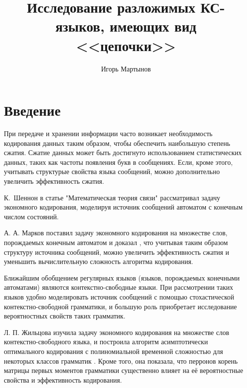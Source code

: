 \documentclass[12pt]{article}
\title{Исследование разложимых КС-языков, имеющих вид <<цепочки>>}
\author{Игорь Мартынов}
\begin{document}
\clearpage



\tableofcontents
\newpage

\section{Введение}
При передаче и хранении информации часто возникает необходимость кодирования данных таким образом, чтобы обеспечить наибольшую степень сжатия. Сжатие данных может быть достигнуто использованием статистических данных, таких как частоты появления букв в сообщениях. Если, кроме этого, учитывать структурые свойства языка сообщений, можно дополнительно увеличить эффективность сжатия.

К.~Шеннон в статье "Математическая теория связи" \cite{shennon-mts} рассматривал задачу экономного кодирования, моделируя источник сообщений автоматом с конечным числом состояний.

А. А. Марков поставил задачу экономного кодирования на множестве слов, порождаемых конечным автоматом и доказал \cite{markov-coding}, что учитывая таким образом структуру источника сообщений, можно увеличить эффективность сжатия и уменьшить вычислительную сложность алгоритма кодирования.

Ближайшим обобщением регулярных языков (языков, порождаемых конечными автоматами) являются контекстно-свободные языки. При рассмотрении таких языков удобно моделировать источник сообщений с помощью стохастической контекстно-свободной грамматики, и большую роль приобретает исследование вероятностных свойств таких грамматик.

Л. П. Жильцова изучила задачу экономного кодирования на множестве слов контекстно-свободного языка, и построила алгоритм асимптотически оптимального кодирования с полиномиальной временной сложностью для некоторых классов грамматик \cite{zhiltsova-zakonom} \cite{zhiltsova-cost}. Кроме того, она показала, что перронов корень \cite{gantmaher-matrix-theory} матрицы первых моментов \cite{sevast-processes} грамматики существенно влияет на её вероятностные свойства и эффективность кодирования.

\end{document}

